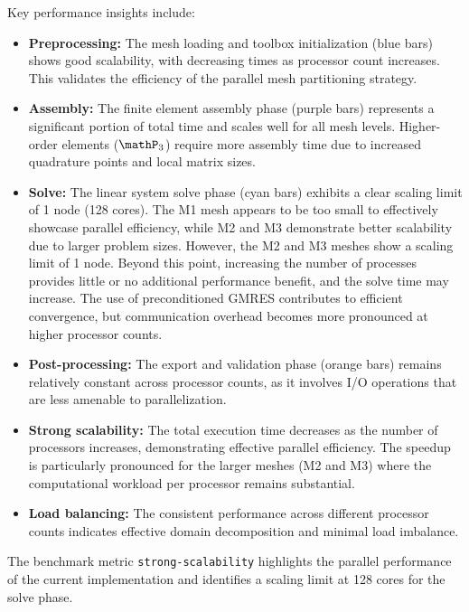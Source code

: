 Key performance insights include:

\begin{itemize}
\item \textbf{Preprocessing:} The mesh loading and toolbox initialization (blue bars) shows good scalability, with decreasing times as processor count increases. This validates the efficiency of the parallel mesh partitioning strategy.

\item \textbf{Assembly:} The finite element assembly phase (purple bars) represents a significant portion of total time and scales well for all mesh levels. Higher-order elements ($\mathP_3$) require more assembly time due to increased quadrature points and local matrix sizes.

\item \textbf{Solve:} The linear system solve phase (cyan bars) exhibits a clear scaling limit of 1 node (128 cores).
    The M1 mesh appears to be too small to effectively showcase parallel efficiency, while M2 and M3 demonstrate better scalability due to larger problem sizes.
    However, the M2 and M3 meshes show a scaling limit of 1 node. Beyond this point, increasing the number of processes provides little or no additional performance benefit, and the solve time may increase.
   The use of preconditioned GMRES contributes to efficient convergence, but communication overhead becomes more pronounced at higher processor counts.

\item \textbf{Post-processing:} The export and validation phase (orange bars) remains relatively constant across processor counts, as it involves I/O operations that are less amenable to parallelization.

\item \textbf{Strong scalability:} The total execution time decreases as the number of processors increases, demonstrating effective parallel efficiency. The speedup is particularly pronounced for the larger meshes (M2 and M3) where the computational workload per processor remains substantial.

\item \textbf{Load balancing:} The consistent performance across different processor counts indicates effective domain decomposition and minimal load imbalance.
\end{itemize}

The benchmark metric \texttt{strong-scalability} highlights the parallel performance of the current \Feelpp implementation and identifies a scaling limit at 128 cores for the solve phase.


